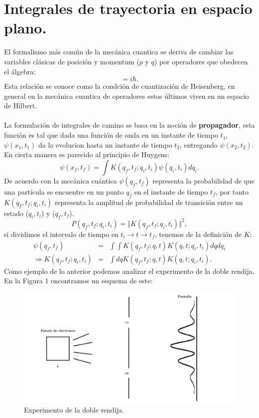 \chapter{Integrales de trayectoria	 en espacio plano.}
El formalismo más común de la mecánica cuantica se deriva de cambiar las variables clásicas de posición y momentum ($p$ y $q$) por operadores que obedecen el álgebra:
\begin{equation}
[\hat{q},\hat{p}]=i\hbar.
\end{equation}
Esta relación se conoce como la condción de cuantización de Heisenberg, en general en la mecánica cuantica de operadores estos últimos viven en un espacio de Hilbert.
\\
\\
La formulación de integrales de camino se basa en la noción de \textbf{propagador}, esta función es tal que dada una función de onda en un instante de tiempo $t_1$, $\psi(x_1,t_1)$ da la evolucion hasta un instante de tiempo $t_2$, entregando $\psi(x_2,t_2)$. En cierta manera es parecido al principio de Huygens:
\begin{equation}
\psi(x_f,t_f)=\int K(q_f,t_f;q_i,t_i)\psi(q_i,t_i)dq_i.
\end{equation}
De acuerdo con la mecánica cuántica $\psi(q_f,t_f)$ representa la probabilidad de que una partícula se encuentre en un punto $q_f$ en el instante de tiempo $t_f$, por tanto $K(q_f,t_f;q_i,t_i)$ representa la amplitud de probabilidad de transición entre un estado ($q_i,t_i$) y ($q_f,t_f$).
\begin{equation}
P(q_f,t_f;q_i,t_i)=\Vert K(q_f,t_f;q_i,t_i) \Vert^2,
\end{equation}
si dividimos el intervalo de tiempo en $t_i\rightarrow t \rightarrow t_f$, tenemos de la definición de $K$:
\begin{eqnarray}
\nonumber \psi(q_f,t_f)&=&\int\int K(q_f,t_f;q,t)K(q,t;q_i,t_i)dqdq_i\\
\Rightarrow K(q_f,t_f;q_i,t_i)&=&\int dq K(q_f,t_f;q,t)K(q,t;q_i,t_i).
\end{eqnarray}
Como ejemplo de lo anterior podemos analizar el experimento de la doble rendija. En la Figura 1 encontramos un esquema de este:
\begin{figure}[h]
\centering
\includegraphics[width=15cm]{Imagenes/Fig1}
\caption[Esquema del experimento de la doble rendija]{Experimento de la doble rendija.}
\end{figure}
